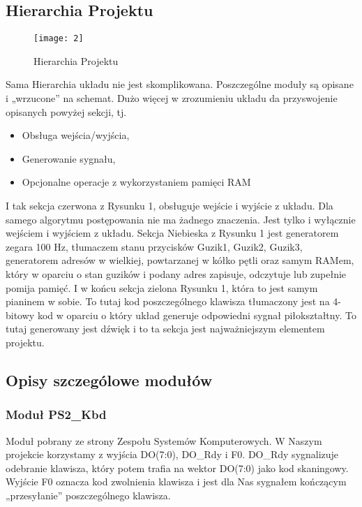 \documentclass[11pt]{article}
\begin{document}
	\newpage
		
	\subsection{Hierarchia Projektu}
	
	\begin{figure}[h]
	\centering
	\texttt{[image: 2]}
	\caption{Hierarchia Projektu}
	\label{fig:2}
	\end{figure}

	Sama Hierarchia układu nie jest skomplikowana. Poszczególne moduły są opisane i „wrzucone” na schemat. Dużo więcej w zrozumieniu układu da przyswojenie opisanych powyżej sekcji, tj.
	\begin{itemize}[noitemsep]
		\item Obsługa wejścia/wyjścia,
		\item Generowanie sygnału,
		\item Opcjonalne operacje z wykorzystaniem pamięci RAM
	\end{itemize}
	
	I tak sekcja czerwona z Rysunku 1, obsługuje wejście i wyjście z układu. Dla samego algorytmu postępowania nie ma żadnego znaczenia. Jest tylko i wyłącznie wejściem i wyjściem z układu. Sekcja Niebieska z Rysunku 1 jest generatorem zegara 100 Hz, tłumaczem stanu przycisków Guzik1, Guzik2, Guzik3, generatorem adresów w wielkiej, powtarzanej w kółko pętli oraz samym RAMem, który w oparciu o stan guzików i podany adres zapisuje, odczytuje lub zupełnie pomija pamięć. I w końcu sekcja zielona Rysunku 1, która to jest samym pianinem w sobie. To tutaj kod poszczególnego klawisza tłumaczony jest na 4-bitowy kod w oparciu o który układ generuje odpowiedni sygnał piłokształtny. To tutaj generowany jest dźwięk i to ta sekcja jest najważniejszym elementem projektu.
	
	\subsection{Opisy szczególowe modułów}
	\subsubsection{Moduł PS2\_Kbd}
	
	Moduł pobrany ze strony Zespołu Systemów Komputerowych. W Naszym projekcie korzystamy z wyjścia DO(7:0), DO\_Rdy i F0. DO\_Rdy sygnalizuje odebranie klawisza, który potem trafia na wektor DO(7:0) jako kod skaningowy. Wyjście F0 oznacza kod zwolnienia klawisza i jest dla Nas sygnałem kończącym „przesyłanie” poszczególnego klawisza. \cite{3}
		
\end{document}
